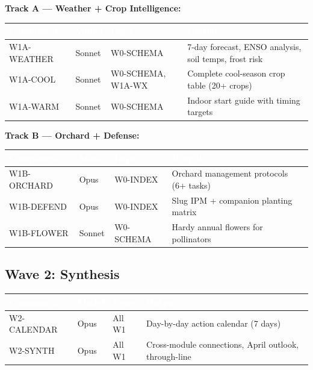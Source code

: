 \documentclass[11pt,letterpaper]{article}
\newcommand{\tableheader}[1]{\textbf{\sffamily\textcolor{white}{#1}}}
\begin{document}
\textbf{Track A --- Weather + Crop Intelligence:}

\begin{center}
\begin{tabularx}{\textwidth}{L{2.5cm}C{1.2cm}L{2cm}X}
\toprule
{}
\tableheader{Component} & \tableheader{Model} & \tableheader{Deps} & \tableheader{Output} \\
\midrule
W1A-WEATHER & Sonnet & W0-SCHEMA & 7-day forecast, ENSO analysis, soil temps, frost risk \\
W1A-COOL & Sonnet & W0-SCHEMA, W1A-WX & Complete cool-season crop table (20+ crops) \\
W1A-WARM & Sonnet & W0-SCHEMA & Indoor start guide with timing targets \\
\bottomrule
\end{tabularx}
\end{center}

\textbf{Track B --- Orchard + Defense:}

\begin{center}
\begin{tabularx}{\textwidth}{L{2.5cm}C{1.2cm}L{2cm}X}
\toprule
{}
\tableheader{Component} & \tableheader{Model} & \tableheader{Deps} & \tableheader{Output} \\
\midrule
W1B-ORCHARD & Opus & W0-INDEX & Orchard management protocols (6+ tasks) \\
W1B-DEFEND & Opus & W0-INDEX & Slug IPM + companion planting matrix \\
W1B-FLOWER & Sonnet & W0-SCHEMA & Hardy annual flowers for pollinators \\
\bottomrule
\end{tabularx}
\end{center}

\subsection{Wave 2: Synthesis}

\begin{center}
\begin{tabularx}{\textwidth}{L{2.5cm}C{1.2cm}L{2cm}X}
\toprule
{}
\tableheader{Component} & \tableheader{Model} & \tableheader{Deps} & \tableheader{Output} \\
\midrule
W2-CALENDAR & Opus & All W1 & Day-by-day action calendar (7 days) \\
W2-SYNTH & Opus & All W1 & Cross-module connections, April outlook, through-line \\
\bottomrule
\end{tabularx}
\end{center}
\end{document}
